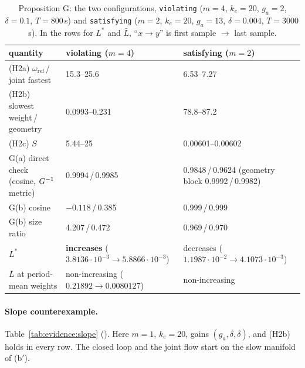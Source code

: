 \begin{table}[htbp]
\centering
\small
\caption{Proposition G: the two configurations, \texttt{violating} ($m=4$, $k_e=20$, $g_a=2$, $\delta=0.1$,
$T=800$\,s) and \texttt{satisfying} ($m=2$, $k_e=20$, $g_a=13$, $\delta=0.004$, $T=3000$\,s). In the rows for $L^*$
and $\bar L$, ``$x\to y$'' is first sample $\to$ last sample.}
\label{tab:evidence:varpro}
\begin{tabularx}{\textwidth}{@{}>{\raggedright\arraybackslash}p{}YY@{}}
\toprule
quantity & violating ($m=4$) & satisfying ($m=2$)\\
\midrule
(H2a) $\omega_{\mathrm{ref}}$\,/\,joint fastest & 15.3--25.6 & 6.53--7.27\\
(H2b) slowest weight\,/\,geometry & 0.0993--0.231 & 78.8--87.2\\
(H2c) $S$ & 5.44--25 & 0.00601--0.00602\\
G(a) direct check (cosine, $G^{-1}$ metric) & 0.9994\,/\,0.9985 & 0.9848\,/\,0.9624 (geometry block
  0.9992\,/\,0.9982)\\
G(b) cosine & $-0.118$\,/\,0.385 & 0.999\,/\,0.999\\
G(b) size ratio & 4.207\,/\,0.472 & 0.969\,/\,0.970\\
$L^*$ & \textbf{increases} ($3.8136\cdot10^{-3}\to5.8866\cdot10^{-3}$) & decreases
  ($1.1987\cdot10^{-2}\to4.1073\cdot10^{-3}$)\\
$\bar L$ at period-mean weights & non-increasing ($0.21892\to0.0080127$) & non-increasing\\
\bottomrule
\end{tabularx}
\end{table}

\paragraph{Slope counterexample.} Table~\ref{tab:evidence:slope} (). Here $m=1$, $k_e=20$,
gains $(g_a,\delta,\delta)$, and (H2b) holds in every row. The closed loop and the joint flow start on the slow
manifold of (b$'$).

